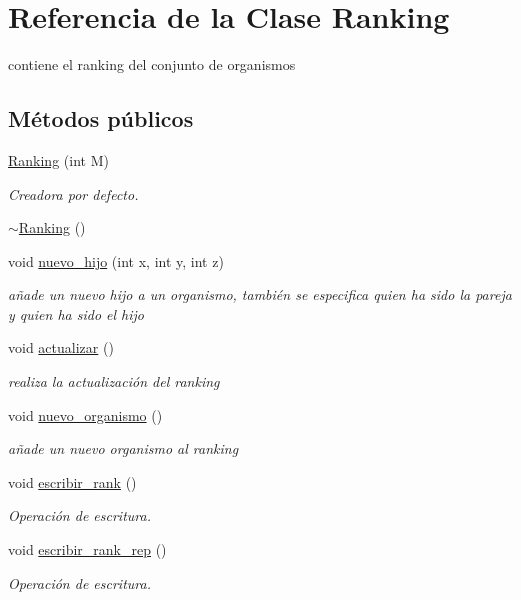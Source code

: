 \hypertarget{class_ranking}{\section{Referencia de la Clase Ranking}
\label{class_ranking}
}


contiene el ranking del conjunto de organismos  


\subsection*{Métodos públicos}
\begin{DoxyCompactItemize}
\item 
\hyperlink{class_ranking_af700e3f1e24eb35173adff4fbcac7c68}{Ranking} (int M)
\begin{DoxyCompactList}\small\item\em Creadora por defecto. \end{DoxyCompactList}\item 
\hyperlink{class_ranking_aa350c65acea82ec0ac42ec80db8bc00f}{$\sim$\-Ranking} ()
\item 
void \hyperlink{class_ranking_a7265b27c9413acc7db65b9e815f3be64}{nuevo\-\_\-hijo} (int x, int y, int z)
\begin{DoxyCompactList}\small\item\em añade un nuevo hijo a un organismo, también se especifica quien ha sido la pareja y quien ha sido el hijo \end{DoxyCompactList}\item 
void \hyperlink{class_ranking_acf63187d3222d4f23c0828a4fb9f7c7b}{actualizar} ()
\begin{DoxyCompactList}\small\item\em realiza la actualización del ranking \end{DoxyCompactList}\item 
void \hyperlink{class_ranking_afa2e8a90b29c55dafbbede7db8ac4ad8}{nuevo\-\_\-organismo} ()
\begin{DoxyCompactList}\small\item\em añade un nuevo organismo al ranking \end{DoxyCompactList}\item 
void \hyperlink{class_ranking_a07bc54ad0b298fcfb9e989294306394b}{escribir\-\_\-rank} ()
\begin{DoxyCompactList}\small\item\em Operación de escritura. \end{DoxyCompactList}\item 
void \hyperlink{class_ranking_acc9b5a82a1c185e90bc654a01a406f31}{escribir\-\_\-rank\-\_\-rep} ()
\begin{DoxyCompactList}\small\item\em Operación de escritura. \end{DoxyCompactList}\end{DoxyCompactItemize}


